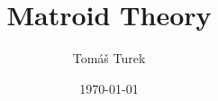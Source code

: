
\usepackage{babel}          %

\title{Matroid Theory}
\author{Tomáš Turek}
\date{\today}


	\maketitle

